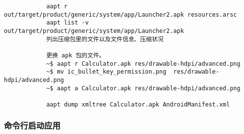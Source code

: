 \documentclass[a4paper,titlepage]{article}
\begin{document}
\begin{enumerate}
        \begin{verbatim}
            aapt r  out/target/product/generic/system/app/Launcher2.apk resources.arsc
            aapt list -v out/target/product/generic/system/app/Launcher2.apk  
            列出压缩包里的文件以及文件信息、压缩状况

            更换 apk 包的文件。
            ~$ aapt r Calculator.apk res/drawable-hdpi/advanced.png
            ~$ mv ic_bullet_key_permission.png  res/drawable-hdpi/advanced.png 
            ~$ aapt a Calculator.apk res/drawable-hdpi/advanced.png

            aapt dump xmltree Calculator.apk AndroidManifest.xml
        \end{verbatim}
\end{enumerate} 

\subsubsection{命令行启动应用}
\end{document}

